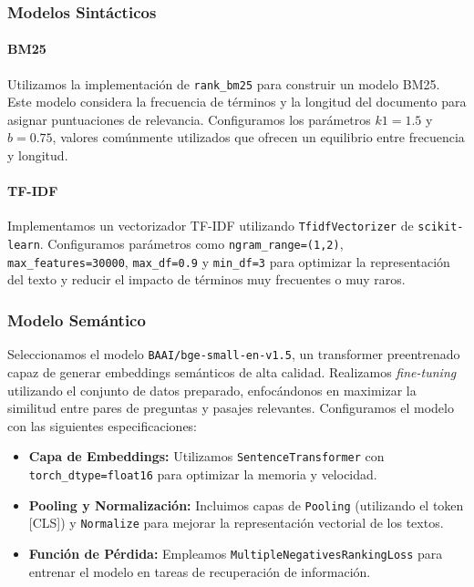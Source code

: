 \documentclass[11pt,english]{article}
\theoremstyle{plain}
\begin{document}
\subsubsection{Modelos Sintácticos}

\paragraph{BM25}

Utilizamos la implementación de \texttt{rank\_bm25} para construir un modelo BM25. Este modelo considera la frecuencia de términos y la longitud del documento para asignar puntuaciones de relevancia. Configuramos los parámetros $k1=1.5$ y $b=0.75$, valores comúnmente utilizados que ofrecen un equilibrio entre frecuencia y longitud.

\paragraph{TF-IDF}

Implementamos un vectorizador TF-IDF utilizando \texttt{TfidfVectorizer} de \texttt{scikit-learn}. Configuramos parámetros como \texttt{ngram\_range=(1,2)}, \texttt{max\_features=30000}, \texttt{max\_df=0.9} y \texttt{min\_df=3} para optimizar la representación del texto y reducir el impacto de términos muy frecuentes o muy raros.

\subsubsection{Modelo Semántico}

Seleccionamos el modelo \texttt{BAAI/bge-small-en-v1.5}, un transformer preentrenado capaz de generar embeddings semánticos de alta calidad. Realizamos \textit{fine-tuning} utilizando el conjunto de datos preparado, enfocándonos en maximizar la similitud entre pares de preguntas y pasajes relevantes. Configuramos el modelo con las siguientes especificaciones:

\begin{itemize}
    \item \textbf{Capa de Embeddings:} Utilizamos \texttt{SentenceTransformer} con \texttt{torch\_dtype=float16} para optimizar la memoria y velocidad.

    \item \textbf{Pooling y Normalización:} Incluimos capas de \texttt{Pooling} (utilizando el token [CLS]) y \texttt{Normalize} para mejorar la representación vectorial de los textos.

    \item \textbf{Función de Pérdida:} Empleamos \texttt{MultipleNegativesRankingLoss} para entrenar el modelo en tareas de recuperación de información.
\end{itemize}
\end{document}
